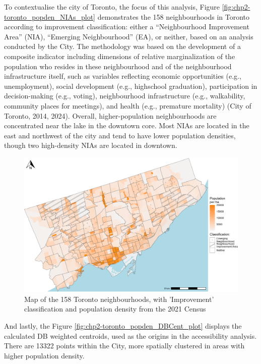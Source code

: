 \documentclass[
11pt, %
oneside, %
english, %
singlespacing, %
]{macthesis} %
\begin{document}
To contextualise the city of Toronto, the focus of this analysis, Figure \ref{fig:chp2-toronto_popden_NIAs_plot} demonstrates the 158 neighbourhoods in Toronto according to improvement classification: either a ``Neighbourhood Improvement Area'' (NIA), ``Emerging Neighbourhood'' (EA), or neither, based on an analysis conducted by the City. The methodology was based on the development of a composite indicator including dimensions of relative marginalization of the population who resides in these neighbourhood and of the neighbourhood infrastructure itself, such as variables reflecting economic opportunities (e.g., unemployment), social development (e.g., highschool graduation), participation in decision-making (e.g., voting), neighbourhood infrastructure (e.g., walkability, community places for meetings), and health (e.g., premature mortality) (City of Toronto, 2014, 2024). Overall, higher-population neighbourhoods are concentrated near the lake in the downtown core. Most NIAs are located in the east and northwest of the city and tend to have lower population densities, though two high-density NIAs are located in downtown.

\begin{figure}

{\centering \includegraphics[width=6in]{./data/figures/chp2-toronto_popden_NIAs_plot} 

}

\caption{\label{fig:chp2-toronto_popden_NIAs_plot}Map of the 158 Toronto neighbourhoods, with 'Improvement' classification and population density from the 2021 Census}\label{fig:unnamed-chunk-6}
\end{figure}

And lastly, the Figure \ref{fig:chp2-toronto_popden_DBCent_plot} displays the calculated DB weighted centroids, used as the origins in the accessibility analysis. There are 13322 points within the City, more spatially clustered in areas with higher population density.
\end{document}
